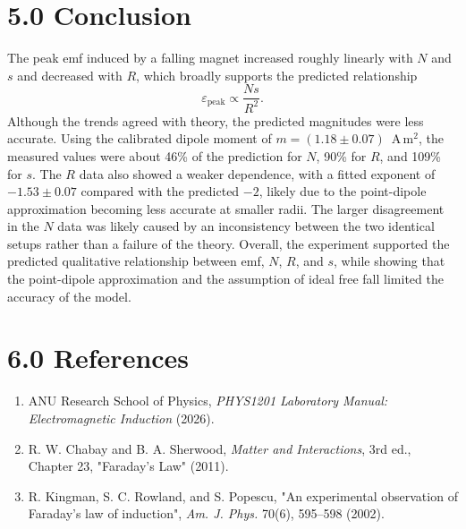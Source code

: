 \documentclass[11pt]{article}
\begin{document}
\section*{5.0 Conclusion}
The peak emf induced by a falling magnet increased roughly linearly with $N$ and $s$ and decreased with $R$, which broadly supports the predicted relationship
\begin{equation}
\varepsilon_{\text{peak}} \propto \frac{Ns}{R^2} .
\end{equation}
Although the trends agreed with theory, the predicted magnitudes were less accurate. Using the calibrated dipole moment of $m = (1.18 \pm 0.07)$~A\,m$^2$, the measured values were about 46\% of the prediction for $N$, 90\% for $R$, and 109\% for $s$. The $R$ data also showed a weaker dependence, with a fitted exponent of $-1.53 \pm 0.07$ compared with the predicted $-2$, likely due to the point-dipole approximation becoming less accurate at smaller radii. The larger disagreement in the $N$ data was likely caused by an inconsistency between the two identical setups rather than a failure of the theory. Overall, the experiment supported the predicted qualitative relationship between emf, $N$, $R$, and $s$, while showing that the point-dipole approximation and the assumption of ideal free fall limited the accuracy of the model.

\section*{6.0 References}
\begin{enumerate}
    \item ANU Research School of Physics, \textit{PHYS1201 Laboratory Manual: Electromagnetic Induction} (2026).
    \item R. W. Chabay and B. A. Sherwood, \textit{Matter and Interactions}, 3rd ed., Chapter 23, "Faraday's Law" (2011).
    \item R. Kingman, S. C. Rowland, and S. Popescu, "An experimental observation of Faraday's law of induction", \textit{Am. J. Phys.} 70(6), 595--598 (2002).
\end{enumerate}
\end{document}
